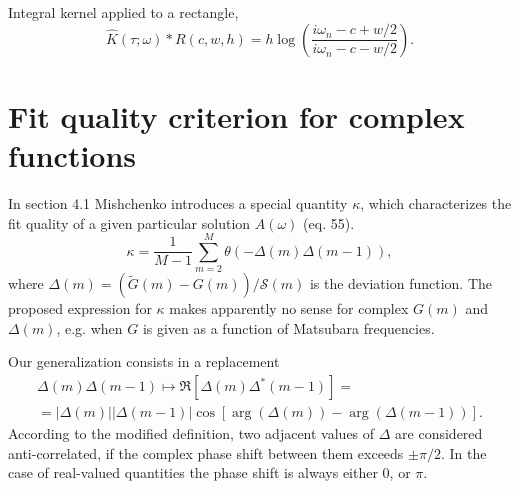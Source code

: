 \documentclass[]{article}
\begin{document}
Integral kernel applied to a rectangle,
\begin{equation}
	\hat K(\tau;\omega)*R(c,w,h) = 
	h \log\left(\frac{i\omega_n - c + w/2}{i\omega_n - c - w/2}\right).
\end{equation}

\section{Fit quality criterion for complex functions}

In section 4.1 Mishchenko introduces a special quantity $\kappa$, which characterizes the fit quality of a given particular solution
$A(\omega)$ (eq. 55).
\begin{equation}
	\kappa = \frac{1}{M-1}\sum_{m=2}^M\theta(-\Delta(m)\Delta(m-1)),
\end{equation}
where $\Delta(m) = (\tilde G(m) - G(m))/\mathcal{S}(m)$ is the deviation function. The proposed expression for $\kappa$ makes  apparently no sense for complex $G(m)$ and $\Delta(m)$, e.g. when $G$ is given as a function of Matsubara frequencies.

Our generalization consists in a replacement
\begin{multline}
	\Delta(m)\Delta(m-1) \mapsto \Re[\Delta(m)\Delta^*(m-1)] =\\=
	|\Delta(m)||\Delta(m-1)|\cos[\arg(\Delta(m)) - \arg(\Delta(m-1))].
\end{multline}
According to the modified definition, two adjacent values of $\Delta$ are considered anti-correlated, if the complex phase shift between them exceeds $\pm\pi/2$. In the case of real-valued quantities the phase shift is always either 0, or $\pi$.
\end{document}
